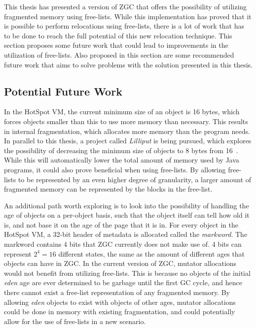 This thesis has presented a version of ZGC that offers the possibility of utilizing fragmented memory using free-lists. While this implementation has proved that it is possible to perform relocations using free-lists, there is a lot of work that has to be done to reach the full potential of this new relocation technique. This section proposes some future work that could lead to improvements in the utilization of free-lists. Also proposed in this section are some recommended future work that aims to solve problems with the solution presented in this thesis.

\subsection{Potential Future Work}
In the HotSpot VM, the current minimum size of an object is 16 bytes, which forces objects smaller than this to use more memory than necessary. This results in internal fragmentation, which allocates more memory than the program needs. In parallel to this thesis, a project called \textit{Lilliput} is being pursued, which explores the possibility of decreasing the minimum size of objects to 8 bytes from 16~\cite{lilliput}. While this will automatically lower the total amount of memory used by Java programs, it could also prove beneficial when using free-lists. By allowing free-lists to be represented by an even higher degree of granularity, a larger amount of fragmented memory can be represented by the blocks in the free-list.

An additional path worth exploring is to look into the possibility of handling the age of objects on a per-object basis, such that the object itself can tell how old it is, and not base it on the age of the page that it is in. For every object in the HotSpot VM, a 32-bit header of metadata is allocated called the \textit{markword}. The markword contains 4 bits that ZGC currently does not make use of. 4 bits can represent $2^4 = 16$ different states, the same as the amount of different ages that objects can have in ZGC. In the current version of ZGC, mutator allocations would not benefit from utilizing free-lists. This is because no objects of the initial \textit{eden} age are ever determined to be garbage until the first GC cycle, and hence there cannot exist a free-list representation of any fragmented memory. By allowing \textit{eden} objects to exist with objects of other ages, mutator allocations could be done in memory with existing fragmentation, and could potentially allow for the use of free-lists in a new scenario.

